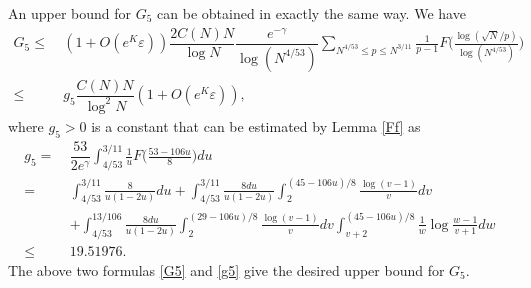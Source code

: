 \documentclass[12pt, a4paper]{amsart}
\def\le{\leqslant}
\theoremstyle{plain}
\theoremstyle{remark}
\numberwithin{equation}{section}
\begin{document}
An upper bound for $G_5$ can be obtained in exactly the same way. We have 
\begin{equation}\label{G5}
\begin{aligned}
G_5\le\ & (1+O(e^K\varepsilon))\dfrac{2C(N)N}{\log N}
\dfrac{e^{-\gamma}}{\log (N^{4/53})}\sum_{N^{4/53} \le p\le N^{3/11}} \frac{1}{p-1} 
F\bigg(\frac{\log (\sqrt{N} / p)}{\log (N^{4/53})}\bigg)\\
\le\ & g_5\dfrac{C(N)N}{\log^2 N}(1+O(e^K\varepsilon)),
\end{aligned}
\end{equation}
where $g_5>0$ is a constant that can be estimated by Lemma \ref{Ff} as 
\begin{equation}\label{g5}
\begin{aligned}
g_{5}=\ & \dfrac{53}{2e^{\gamma}}\int_{4/53}^{3/11} \frac{1}{u}F\bigg(\frac{53-106u}{8}\bigg)du\\
=\ &\int_{4/53}^{3/11} \frac{8}{u(1-2u)}du+\int_{4/53}^{3/11} \frac{8du}{u(1-2u)}\int_2^{(45-106u)/8} \frac{\log (v-1)}{v} d v\\
&+\int_{4/53}^{13/106} \frac{8du}{u(1-2u)}\int_2^{(29-106u)/8} \frac{\log (v-1)}{v} d v \int_{v+2}^{(45-106u)/8} \frac{1}{w} \log \frac{w-1}{v+1} dw\\
\le\ & 19.51976.
\end{aligned}
\end{equation}
The above two formulas \eqref{G5} and \eqref{g5} give the desired upper bound for $G_5$. 
\end{document}
